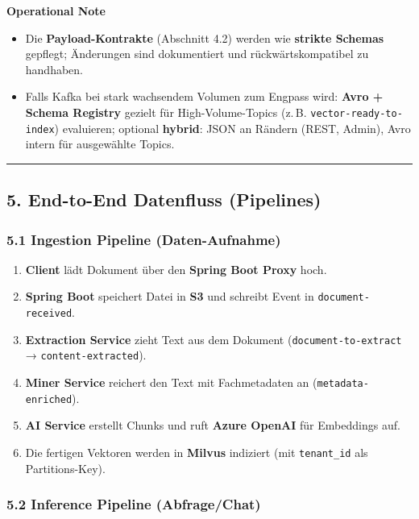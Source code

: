 \textbf{Operational Note}

\begin{itemize}
\tightlist
\item
  Die \textbf{Payload-Kontrakte} (Abschnitt 4.2) werden wie
  \textbf{strikte Schemas} gepflegt; Änderungen sind dokumentiert und
  rückwärtskompatibel zu handhaben.
\item
  Falls Kafka bei stark wachsendem Volumen zum Engpass wird:
  \textbf{Avro + Schema Registry} gezielt für High-Volume-Topics (z.\,B.
  \texttt{vector-ready-to-index}) evaluieren; optional \textbf{hybrid}:
  JSON an Rändern (REST, Admin), Avro intern für ausgewählte Topics.
\end{itemize}

\begin{center}\rule{0.5\linewidth}{0.5pt}\end{center}

\subsection{5. End-to-End Datenfluss
(Pipelines)}\label{end-to-end-datenfluss-pipelines}

\subsubsection{5.1 Ingestion Pipeline
(Daten-Aufnahme)}\label{ingestion-pipeline-daten-aufnahme}

\begin{enumerate}
\def\labelenumi{\arabic{enumi}.}
\tightlist
\item
  \textbf{Client} lädt Dokument über den \textbf{Spring Boot Proxy}
  hoch.
\item
  \textbf{Spring Boot} speichert Datei in \textbf{S3} und schreibt Event
  in \texttt{document-received}.
\item
  \textbf{Extraction Service} zieht Text aus dem Dokument
  (\texttt{document-to-extract} → \texttt{content-extracted}).
\item
  \textbf{Miner Service} reichert den Text mit Fachmetadaten an
  (\texttt{metadata-enriched}).
\item
  \textbf{AI Service} erstellt Chunks und ruft \textbf{Azure OpenAI} für
  Embeddings auf.
\item
  Die fertigen Vektoren werden in \textbf{Milvus} indiziert (mit
  \texttt{tenant\_id} als Partitions-Key).
\end{enumerate}

\subsubsection{5.2 Inference Pipeline
(Abfrage/Chat)}\label{inference-pipeline-abfragechat}

